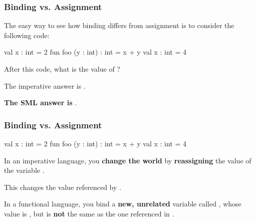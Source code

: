 \documentclass[aspectratio=169, handout]{beamer}
\begin{document}
\begin{frame}[fragile]
  \frametitle{Binding vs. Assignment}

  The easy way to see how binding differs from assignment is to consider
  the following code:

  \pause
  \vspace{\fill}

  \begin{codeblock}
    val x : int = 2
    fun foo (y : int) : int = x + y
    val x : int = 4
  \end{codeblock}

  \pause
  \vspace{\fill}

  After this code, what is the value of ?

  \pause
  \vspace{\fill}

  The imperative answer is .

  \pause
  \vspace{\fill}

  \textbf{The SML answer is }.
\end{frame}

\begin{frame}[fragile]
  \frametitle{Binding vs. Assignment}

  \begin{codeblock}
    val x : int = 2
    fun foo (y : int) : int = x + y
    val x : int = 4
  \end{codeblock}

  \pause
  \vspace{\fill}

  In an imperative language, you \textbf{change the world} by \textbf{reassigning} the
  value of the variable .

  \vspace{5pt}

  This changes the value referenced by .

  \pause
  \vspace{\fill}

  In a functional language, you bind a \textbf{new, unrelated} variable called ,
  whose value is , but is \textbf{not} the same as the one referenced in .

  \vspace{\fill}

\end{frame}
\end{document}
